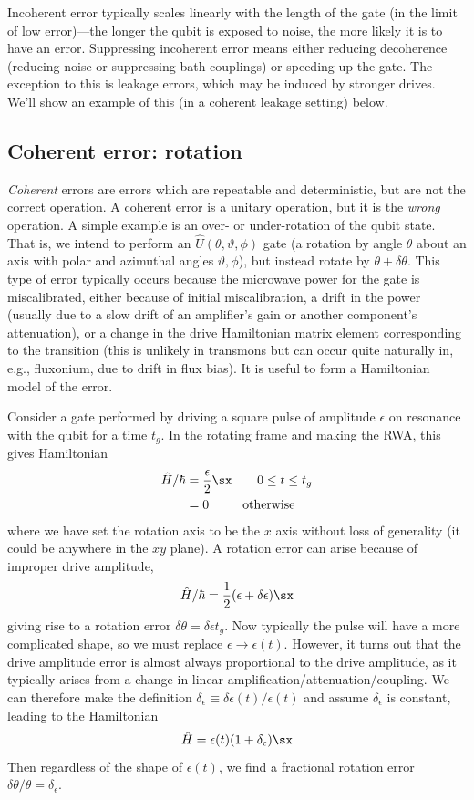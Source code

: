 Incoherent error typically scales linearly with the length of the gate (in the limit of low error)---the longer the qubit is exposed to noise, the more likely it is to have an error. Suppressing incoherent error means either reducing decoherence (reducing noise or suppressing bath couplings) or speeding up the gate. The exception to this is leakage errors, which may be induced by stronger drives. We'll show an example of this (in a coherent leakage setting) below.

\subsection{Coherent error: rotation}
\textit{Coherent} errors are errors which are repeatable and deterministic, but are not the correct operation. A coherent error is a unitary operation, but it is the \textit{wrong} operation. A simple example is an over- or under-rotation of the qubit state. That is, we intend to perform an $\hat{U}(\theta,\vartheta,\phi)$ gate (a rotation by angle $\theta$ about an axis with polar and azimuthal angles $\vartheta,\phi$), but instead rotate by $\theta +\delta\theta$. This type of error typically occurs because the microwave power for the gate is miscalibrated, either because of initial miscalibration, a drift in the power (usually due to a slow drift of an amplifier's gain or another component's attenuation), or a change in the drive Hamiltonian matrix element corresponding to the transition (this is unlikely in transmons but can occur quite naturally in, e.g., fluxonium, due to drift in flux bias). It is useful to form a Hamiltonian model of the error.

Consider a gate performed by driving a square pulse of amplitude $\epsilon$ on resonance with the qubit for a time $t_g$. In the rotating frame and making the RWA, this gives Hamiltonian
\begin{align*}
    \hat{H}/\hbar &= \frac{\epsilon}{2} \sx \qquad 0\leq t \leq t_g \\
& = 0 \qquad \ \ \mathrm{otherwise}
\end{align*}
where we have set the rotation axis to be the $x$ axis without loss of generality (it could be anywhere in the $xy$ plane). A rotation error can arise because of improper drive amplitude,
\begin{equation}
    \hat{H}/\hbar =\frac{1}{2} (\epsilon + \delta\epsilon)\sx
\end{equation}
giving rise to a rotation error $\delta\theta=\delta\epsilon t_g$. Now typically the pulse will have a more complicated shape, so we must replace $\epsilon\rightarrow\epsilon (t)$. However, it turns out that the drive amplitude error is almost always proportional to the drive amplitude, as it typically arises from a change in linear amplification/attenuation/coupling. We can therefore make the definition $\delta_\epsilon \equiv \delta\epsilon(t)/\epsilon(t)$ and assume $\delta_\epsilon$ is constant, leading to the Hamiltonian
\begin{equation}
    \hat{H} = \epsilon(t)(1+\delta_\epsilon)\sx
\end{equation}
Then regardless of the shape of $\epsilon(t)$, we find a fractional rotation error $\delta\theta / \theta = \delta_\epsilon$.


